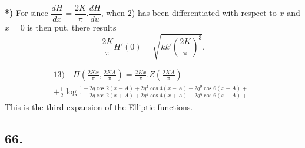 \documentclass{article}
\begin{document}
\textbf{*)} For since $\dfrac{dH}{dx}=\dfrac{2K}{\pi}.\dfrac{dH}{du}$, when 2) has been differentiated with respect to $x$ and $x=0$ is then put, there results
\[
\frac{2K}{\pi}H'(0)=\sqrt{kk'\left(\frac{2K}{\pi}\right)^{3}}.
\]

\[
\begin{gathered}
\text{13)}\quad\Pi\left(\frac{2Kx}{\pi},\frac{2KA}{\pi}\right)=\frac{2Kx}{\pi}.Z\left(\frac{2KA}{\pi}\right)\\[1.5ex]
+\frac{1}{2}\log\frac{1-2q\cos 2(x-A)+2q^{4}\cos 4(x-A)-2q^{9}\cos 6(x-A)+.\,.}{1-2q\cos 2(x+A)+2q^{4}\cos 4(x+A)-2q^{9}\cos 6(x+A)+.\,.}
\end{gathered}
\]
This is the third expansion of the Elliptic functions.

\subsection*{66.}
\end{document}
